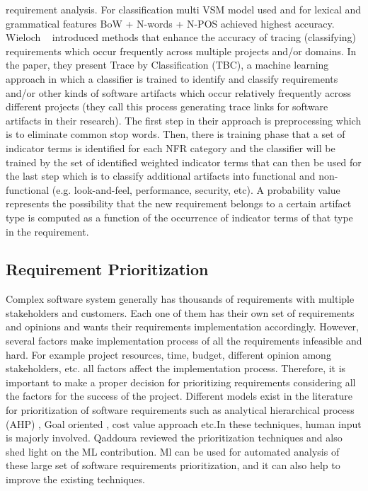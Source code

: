 requirement analysis. For classification multi VSM model used and for lexical
and grammatical features BoW + N-words + N-POS achieved highest accuracy.
Wieloch \etal~\cite{Wieloch:2013} introduced methods that enhance the accuracy
of tracing (classifying) requirements which occur frequently across multiple
projects and/or domains. In the paper, they present Trace by  Classification
(TBC),  a machine learning approach in which a classifier is trained to identify
and classify requirements and/or other kinds of software artifacts which occur
relatively frequently across different projects (they call this process
generating trace links for software artifacts in their research). The first step
in their approach is preprocessing which is to eliminate common stop words.
Then, there is training phase that a set of indicator terms is identified for
each NFR category and the classifier will be trained by the set of identified
weighted indicator terms that can then be used for the last step which is to
classify additional artifacts into functional and non-functional (e.g.
look-and-feel, performance, security, etc). A probability value represents the
possibility that the new requirement belongs to a certain artifact type is
computed as a function of the occurrence of indicator terms of that type in the
requirement.

\subsection{Requirement Prioritization}
Complex software system generally has thousands of requirements with multiple
stakeholders and customers. Each one of them has their own set of requirements
and opinions and wants their requirements implementation accordingly. However,
several factors make implementation process of all the requirements infeasible
and hard. For example project resources, time, budget, different opinion among
stakeholders, etc. all factors affect the implementation process. Therefore, it
is important to make a proper decision for prioritizing requirements considering
all the factors for the success of the project. Different models exist in the
literature for prioritization of software requirements such as analytical
hierarchical process (AHP) \cite{saaty2008}, Goal oriented
\cite{VanLamsweerde:2001}, cost value approach \cite{Karlsson:1997} etc.In these
techniques, human input is majorly involved. Qaddoura \etal \cite{RQaddoura}
reviewed the prioritization techniques and also shed light on the ML
contribution. Ml can be used for automated analysis of these large set of
software requirements prioritization, and it can also help to improve the existing techniques.

